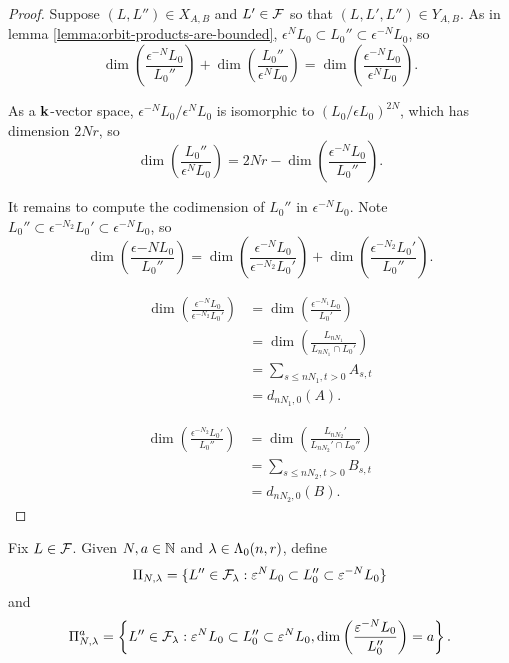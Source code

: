 \documentclass[a4paper, 11pt]{report}
\begin{document}
\begin{proof}
Suppose $(L,L'')\in X_{A,B}$ and $L'\in\mathcal{F}$ so that $(L,L',L'')\in Y_{A,B}$. As in lemma \ref{lemma:orbit-products-are-bounded}, $\epsilon^N L_0\subset L_0''\subset \epsilon^{-N}L_0$, so
\begin{equation*}
\dim\left(\frac{\epsilon^{-N}L_0}{L_0''}\right) + \dim\left(\frac{L_0''}{\epsilon^N L_0}\right) = \dim\left(\frac{\epsilon^{-N}L_0}{\epsilon^N L_0}\right).
\end{equation*}

As a $\mathbf{k}$-vector space, $\epsilon^{-N}L_0/\epsilon^N L_0$ is isomorphic to $(L_0/{\epsilon L_0})^{2N}$, which has dimension $2Nr$, so
\begin{equation*}
\dim\left(\frac{L_0''}{\epsilon^N L_0}\right) = 2Nr - \dim\left(\frac{\epsilon^{-N}L_0}{L_0''}\right).
\end{equation*}

It remains to compute the codimension of $L_0''$ in $\epsilon^{-N}L_0$. Note $L_0''\subset \epsilon^{-N_2}L_0'\subset \epsilon^{-N} L_0$, so
\begin{equation*}
\dim\left(\frac{\epsilon{-N}L_0}{L_0''}\right) = \dim\left(\frac{\epsilon^{-N}L_0}{\epsilon^{-N_2}L_0'}\right) + \dim\left(\frac{\epsilon^{-N_2}L_0'}{L_0''}\right).
\end{equation*}

\begin{align*}
\dim\left(\frac{\epsilon^{-N}L_0}{\epsilon^{-N_2}L_0'}\right)
&= \dim\left(\frac{\epsilon^{-N_1}L_0}{L_0'}\right)\\
&= \dim\left(\frac{L_{nN_1}}{L_{nN_1}\cap L_0'}\right)\\
&= \sum_{s\le nN_1, t>0} A_{s,t}\\
&= d_{nN_1,0}(A).
\end{align*}

\begin{align*}
\dim\left(\frac{\epsilon^{-N_2}L_0'}{L_0''}\right)
&= \dim\left(\frac{ L_{nN_2}'}{L_{nN_2}'\cap L_0''}\right)\\
&= \sum_{s\le nN_2, t>0} B_{s,t}\\
&= d_{nN_2,0}(B).
\end{align*}
\end{proof}


Fix $L\in\mathcal{F}$. Given $N,a\in\mathbb{N}$ and $\lambda\in\Lambda_0(n,r)$, define
\begin{equation*}
\Pi_{N,\lambda} = \{L''\in\mathcal{F}_\lambda: \varepsilon^N L_0\subset L_0''\subset \varepsilon^{-N}L_0\}
\end{equation*}
and
\begin{equation*}
\Pi_{N,\lambda}^a = \left\{L''\in\mathcal{F}_\lambda: \varepsilon^N L_0\subset L_0''\subset \varepsilon^{N}L_0, \dim\left(\frac{\varepsilon^{-N}L_0}{L_0''}\right) = a\right\}.
\end{equation*}
\end{document}

